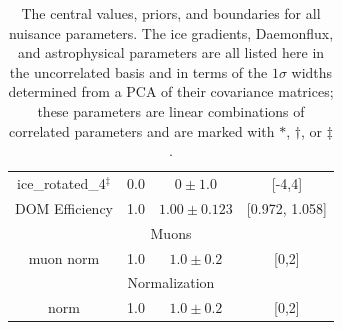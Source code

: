 \documentclass[main.tex]{subfiles}
\begin{document}
\begin{table}
\begin{tabular}{c | ccc}
        ice\_rotated\_4$^{\ddag}$ & 0.0 & $0\pm 1.0$ & [-4,4]\\
        DOM Efficiency & 1.0 & $1.00\pm0.123$ & [0.972, 1.058]\\
        \multicolumn{4}{c}{Muons} \\\hline
        muon norm & 1.0 & $1.0\pm0.2$ & [0,2]\\
        \multicolumn{4}{c}{Normalization} \\\hline
        norm & 1.0 & $1.0\pm0.2$ & [0,2]
    \end{tabular}
    \caption{The central values, priors, and boundaries for all nuisance parameters. The ice gradients, Daemonflux, and astrophysical parameters are all listed here in the uncorrelated basis and in terms of the $1\sigma$ widths determined from a PCA of their covariance matrices; these parameters are linear combinations of correlated parameters and are marked with $*$, $\dag$, or $\ddag$.}\label{table:nutrition}
\end{table}
\end{document}
